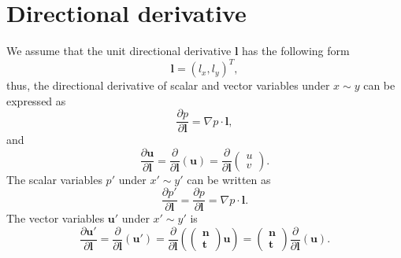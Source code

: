 \documentclass[review]{elsarticle}
\begin{document}
\section{Directional derivative}
We assume that the unit directional derivative $\bm{l}$ has the following form
\begin{equation}\label{vector_l}
	\bm{l}=(l_x, l_y)^T,
\end{equation}
thus, the directional derivative of scalar and vector variables under $x \sim y$ can be expressed as
\begin{equation}\label{directionalDerivatives:scalar:origin}
	\frac{\partial p}{\partial \bm{l}} = \nabla p \cdot \bm{l}, 
\end{equation}
and 
\begin{equation}\label{directionalDerivatives:vector:origin}
	\frac{\partial \bm{u}}{\partial \bm{l}} = \frac{\partial}{\partial \bm{l}}\left(\bm{u}\right)
	=\frac{\partial}{\partial \bm{l}}\left(
		\begin{array}{c}
			u\\
			v
		\end{array}
		\right).
\end{equation}\label{directionalDerivatives:scalar:new}
The scalar variables $p'$ under $x' \sim y'$ can be written as
\begin{equation}
	\frac{\partial p'}{\partial \bm{l}}=\frac{\partial p}{\partial \bm{l}} = \nabla p \cdot \bm{l}. 
\end{equation}
The vector variables $\bm{u}'$ under $x' \sim y'$ is
\begin{equation}\label{directionalDerivatives:vector:new}
	\frac{\partial \bm{u}'}{\partial \bm{l}} = \frac{\partial}{\partial \bm{l}}\left(\bm{u}'\right)
	=\frac{\partial}{\partial \bm{l}}\left(\left(
		\begin{array}{c}
			\bm{n} \\
			\bm{t}
		\end{array}
	\right)\bm{u}\right)
	=\left(
		\begin{array}{c}
			\bm{n} \\
			\bm{t}
		\end{array}
	\right)\frac{\partial}{\partial \bm{l}}\left(\bm{u}\right).
\end{equation}
\end{document}
